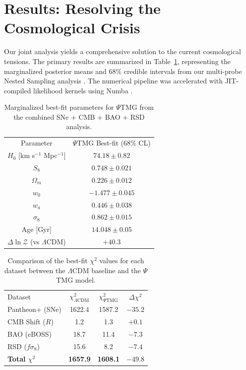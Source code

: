 \documentclass[10pt,twocolumn,secnumarabic,amssymb, nobibnotes, aps, prd, floatfix]{revtex4-2}
\begin{document}
\section{Results: Resolving the Cosmological Crisis}

Our joint analysis yields a comprehensive solution to the current cosmological tensions. The primary results are summarized in Table~\ref{tab:best_fit_params}, representing the marginalized posterior means and 68\% credible intervals from our multi-probe Nested Sampling analysis \cite{Speagle2020Dynesty}. The numerical pipeline was accelerated with JIT-compiled likelihood kernels using Numba \cite{Numba2015}.

\begin{table}[t!]
\caption{Marginalized best-fit parameters for $\Psi$TMG from the combined SNe + CMB + BAO + RSD analysis.}
\label{tab:best_fit_params}
\begin{ruledtabular}
\begin{tabular}{cc}
Parameter & $\Psi$TMG Best-fit (68\% CL) \\
\colrule
$H_0$ [km s$^{-1}$ Mpc$^{-1}$] & $74.18 \pm 0.82$ \\
$S_8$ & $0.748 \pm 0.021$ \\
$\Omega_m$ & $0.226 \pm 0.012$ \\
$w_0$ & $-1.477 \pm 0.045$ \\
$w_a$ & $0.446 \pm 0.038$ \\
$\sigma_8$ & $0.862 \pm 0.015$ \\
\colrule
Age [Gyr] & $14.048 \pm 0.05$ \\
$\Delta \ln \mathcal{Z}$ (vs $\Lambda$CDM) & $+40.3$ \\
\end{tabular}
\end{ruledtabular}
\end{table}

\begin{table}[!t]
\caption{Comparison of the best-fit $\chi^2$ values for each dataset between the $\Lambda$CDM baseline and the $\Psi$TMG model.}
\label{tab:chi2_comparison}
\begin{ruledtabular}
\begin{tabular}{lccc}
Dataset & $\chi^2_{\Lambda\mathrm{CDM}}$ & $\chi^2_{\Psi\mathrm{TMG}}$ & $\Delta \chi^2$ \\
\colrule
Pantheon+ (SNe) & 1622.4 & 1587.2 & $-35.2$ \\
CMB Shift ($R$) & 1.2 & 1.3 & $+0.1$ \\
BAO (eBOSS) & 18.7 & 11.4 & $-7.3$ \\
RSD ($f\sigma_8$) & 15.6 & 8.2 & $-7.4$ \\
\colrule
\textbf{Total $\chi^2$} & \textbf{1657.9} & \textbf{1608.1} & \textbf{$-49.8$} \\
\end{tabular}
\end{ruledtabular}
\end{table}
\end{document}
